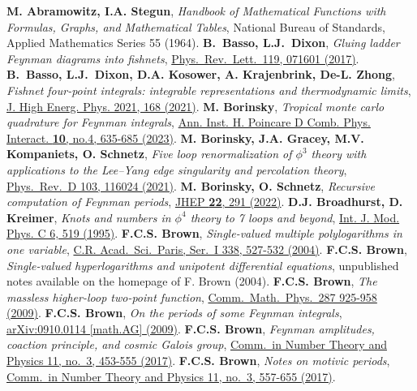 \documentclass[oneside]{amsart}
\theoremstyle{plain}
\newcommand*{\doilink}[2]{\href{https://doi.org/\detokenize{#2}}{#1}}
\newcommand*{\arxivlink}[2]{\href{https://arxiv.org/abs/\detokenize{#2}}{#1}}
\begin{document}

\renewcommand\refname{References}
\begin{thebibliography}{99}
 {\bf M. Abramowitz, I.A. Stegun}, {\it Handbook of Mathematical Functions with Formulas, Graphs, and Mathematical Tables}, National Bureau of Standards,
Applied Mathematics Series 55 (1964).
 {\bf B.~Basso, L.J.~Dixon}, {\it Gluing ladder Feynman diagrams into fishnets}, \doilink{Phys.\ Rev.\ Lett.\ 119, 071601 (2017)}{10.1103/PhysRevLett.119.071601}.
 {\bf B.~Basso, L.J.~Dixon, D.A. Kosower, A. Krajenbrink, De-L. Zhong}, {\it Fishnet four-point integrals: integrable representations and thermodynamic limits},
\doilink{J. High Energ. Phys. 2021, 168 (2021)}{10.1007/JHEP07(2021)168}.
 {\bf M. Borinsky}, {\it Tropical monte carlo quadrature for Feynman integrals}, \doilink{Ann. Inst. H. Poincare D Comb. Phys. Interact. \textbf{10}, no.4, 635-685 (2023)}{10.4171/aihpd/158}.
 {\bf M. Borinsky, J.A. Gracey, M.V. Kompaniets, O. Schnetz}, {\it Five loop renormalization of $\phi^3$ theory with applications to the Lee--Yang edge singularity and percolation theory}, \doilink{Phys.\ Rev.\ D 103, 116024 (2021)}{10.1103/PhysRevD.103.116024}.
 {\bf M. Borinsky, O. Schnetz}, {\it Recursive computation of Feynman periods}, \doilink{JHEP \textbf{22}, 291 (2022)}{doi:10.1007/JHEP08(2022)291}.
 {\bf D.J. Broadhurst, D. Kreimer}, {\it Knots and numbers in $\phi^4$ theory to 7 loops and beyond}, \doilink{Int. J. Mod. Phys. C 6, 519 (1995)}{10.1142/S012918319500037X}.
 {\bf F.C.S. Brown}, {\it Single-valued  multiple polylogarithms in one variable}, \doilink{C.R. Acad.\ Sci.\ Paris, Ser.\ I 338, 527-532 (2004)}{10.1016/j.crma.2004.02.001}.
 {\bf F.C.S. Brown}, {\it Single-valued  hyperlogarithms and unipotent differential equations}, unpublished notes available on the homepage of F. Brown (2004).
 {\bf F.C.S. Brown}, {\it The massless higher-loop two-point function}, \doilink{Comm.\ Math.\ Phys.\ 287 925-958 (2009)}{10.1007/s00220-009-0740-5}.
 {\bf F.C.S. Brown}, {\it On the periods of some Feynman integrals}, \arxivlink{arXiv:0910.0114 [math.AG] (2009)}{0910.0114}.
 {\bf F.C.S. Brown}, {\it Feynman amplitudes, coaction principle, and cosmic Galois group}, \doilink{Comm.\ in Number Theory and Physics 11, no.\ 3, 453-555 (2017)}{10.4310/CNTP.2017.v11.n3.a1}.
 {\bf F.C.S. Brown}, {\it Notes on motivic periods}, \doilink{Comm.\ in Number Theory and Physics 11, no.\ 3, 557-655 (2017)}{10.4310/CNTP.2017.v11.n3.a2}.

\end{thebibliography}
\end{document}
